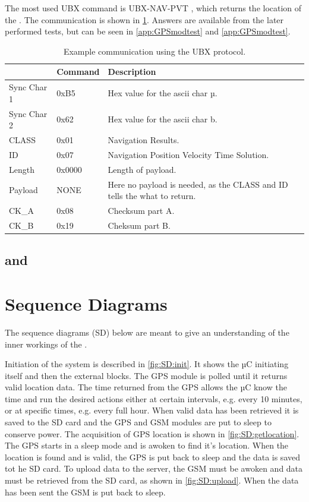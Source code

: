 The most used UBX command is UBX-NAV-PVT \cite[p.~160]{NEO7_proto}, which returns the location of the \GPS.
The communication is shown in \cref{tab:UBXex}.
Answers are available from the later performed tests, but can be seen in \cref{app:GPSmodtest} and \cref{app:GPSmodtest}.

\begin{table}
	\centering
	\begin{tabularx}{\textwidth}{l l X}
		\toprule
		& \textbf{Command} & \textbf{Description} \\
		\midrule
		Sync Char 1 & 0xB5 & Hex value for the ascii char µ. \\
		Sync Char 2 & 0x62 & Hex value for the ascii char b. \\
		CLASS & 0x01 & Navigation Results. \\
		ID & 0x07 &  Navigation Position Velocity Time Solution. \\
		Length & 0x0000 & Length of payload. \\
		Payload & NONE & Here no payload is needed, as the CLASS and ID tells the \GPS what to return. \\
		CK\_A & 0x08 & Checksum part A. \\
		CK\_B & 0x19 & Cheksum part B. \\
		\bottomrule
	\end{tabularx}
	\caption{Example communication using the UBX protocol.}
	\label{tab:UBXex}
\end{table}

\subsection{\SAMD and \SARA}

\section{Sequence Diagrams}
The sequence diagrams (SD) below are meant to give an understanding of the inner workings of the \systemName.

Initiation of the system is described in \cref{fig:SD:init}.
It shows the µC initiating itself and then the external blocks.
The GPS module is polled until it returns valid location data. The time returned from the GPS allows the µC know the time and run the desired actions either at certain intervals, e.g. every 10 minutes, or at specific times, e.g. every full hour.
When valid data has been retrieved it is saved to the SD card and the GPS and GSM modules are put to sleep to conserve power.
The acquisition of GPS location is shown in \cref{fig:SD:getlocation}.
The GPS starts in a sleep mode and is awoken to find it's location.
When the location is found and is valid, the GPS is put back to sleep and the data is saved tot he SD card.
To upload data to the server, the GSM must be awoken and data must be retrieved from the SD card, as shown in \cref{fig:SD:upload}.
When the data has been sent the GSM is put back to sleep.

